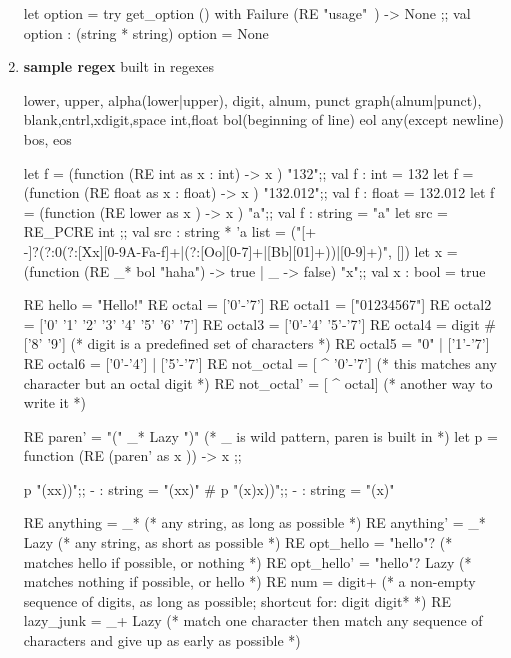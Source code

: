 \begin{enumerate}
\begin{alternate}
let option = try get_option () with Failure (RE "usage"~) -> None ;;
val option : (string * string) option = None  
\end{alternate}


\item \textbf{sample regex}
  built in regexes
  \begin{bluetext}
    lower, upper, alpha(lower|upper), digit, alnum, punct
    graph(alnum|punct), blank,cntrl,xdigit,space
    int,float
    bol(beginning of line)
    eol
    any(except newline)
    bos, eos
  \end{bluetext}
  \begin{alternate}
let f = (function (RE int as x : int) -> x ) "132";;
val f : int = 132
let f = (function (RE float as x : float) -> x ) "132.012";;
val f : float = 132.012
let f = (function (RE lower as x ) -> x ) "a";;
val f : string = "a"
let src = RE_PCRE int ;;
val src : string * 'a list = ("[+\\-]?(?:0(?:[Xx][0-9A-Fa-f]+|(?:[Oo][0-7]+|[Bb][01]+))|[0-9]+)", [])
let x = (function (RE _* bol "haha") -> true | _ -> false) "x\nhaha";;
val x : bool = true
\end{alternate}

\begin{bluecode}
RE hello = "Hello!" 
RE octal  = ['0'-'7']
RE octal1 = ["01234567"]
RE octal2 = ['0' '1' '2' '3' '4' '5' '6' '7']
RE octal3 = ['0'-'4' '5'-'7']
RE octal4 = digit # ['8' '9']  (* digit is a predefined set of characters *)
RE octal5 = "0" | ['1'-'7']
RE octal6 = ['0'-'4'] | ['5'-'7']
RE not_octal = [ ^ '0'-'7'] (* this matches any character but an octal digit *)
RE not_octal' = [ ^ octal]  (* another way to write it *)
\end{bluecode}

\begin{redcode}
RE paren' = "(" _* Lazy ")"
(* _ is wild pattern, paren is built in *)
let p = function (RE (paren' as x )) -> x ;;
\end{redcode}

\begin{alternate}
p "(xx))";;
- : string = "(xx)"
# p "(x)x))";;
- : string = "(x)"
\end{alternate}

\begin{bluecode}
RE anything  = _*         (* any string, as long as possible *)
RE anything' = _* Lazy    (* any string, as short as possible *)
RE opt_hello  = "hello"?      (* matches hello if possible, or nothing *)
RE opt_hello' = "hello"? Lazy (* matches nothing if possible, or hello *)
RE num = digit+        (* a non-empty sequence of digits, as long as possible;
                          shortcut for: digit digit* *)
RE lazy_junk = _+ Lazy (* match one character then match any sequence
                          of characters and give up as early as possible *)


\end{bluecode}
\end{enumerate}
